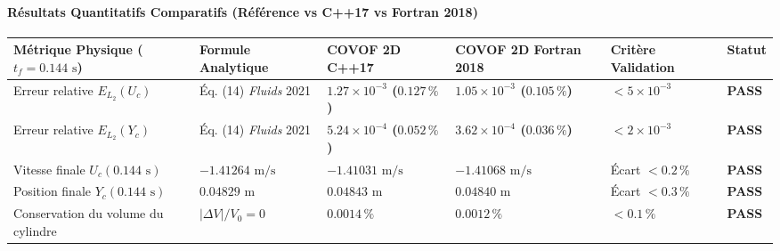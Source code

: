 \documentclass[
  10pt,
]{article}
\newcounter{none} %
\begin{document}
\paragraph{Résultats Quantitatifs Comparatifs (Référence vs C++17 vs
Fortran
2018)}\label{ruxe9sultats-quantitatifs-comparatifs-ruxe9fuxe9rence-vs-c17-vs-fortran-2018-14}

{\def\LTcaptype{none} %
\begin{longtable}[]{@{}
  >{\raggedright\arraybackslash}p{}
  >{\centering\arraybackslash}p{}
  >{\centering\arraybackslash}p{}
  >{\centering\arraybackslash}p{}
  >{\centering\arraybackslash}p{}
  >{\centering\arraybackslash}p{}@{}}
\toprule\noalign{}
\begin{minipage}[b]{\linewidth}\raggedright
Métrique Physique (\(t_f = 0.144\text{ s}\))
\end{minipage} & \begin{minipage}[b]{\linewidth}\centering
Formule Analytique
\end{minipage} & \begin{minipage}[b]{\linewidth}\centering
COVOF 2D C++17
\end{minipage} & \begin{minipage}[b]{\linewidth}\centering
COVOF 2D Fortran 2018
\end{minipage} & \begin{minipage}[b]{\linewidth}\centering
Critère Validation
\end{minipage} & \begin{minipage}[b]{\linewidth}\centering
Statut
\end{minipage} \\
\midrule\noalign{}
\endhead
\bottomrule\noalign{}
\endlastfoot
Erreur relative \(E_{L_2}(U_c)\) & Éq. (14) \emph{Fluids} 2021 &
\textbf{\(1.27 \times 10^{-3}\) (\(0.127\,\%\))} &
\textbf{\(1.05 \times 10^{-3}\) (\(0.105\,\%\))} &
\(< 5 \times 10^{-3}\) & \textbf{PASS} \\
Erreur relative \(E_{L_2}(Y_c)\) & Éq. (14) \emph{Fluids} 2021 &
\textbf{\(5.24 \times 10^{-4}\) (\(0.052\,\%\))} &
\textbf{\(3.62 \times 10^{-4}\) (\(0.036\,\%\))} &
\(< 2 \times 10^{-3}\) & \textbf{PASS} \\
Vitesse finale \(U_c(0.144\text{ s})\) & \(-1.41264\text{ m/s}\) &
\textbf{\(-1.41031\text{ m/s}\)} & \textbf{\(-1.41068\text{ m/s}\)} &
Écart \(< 0.2\,\%\) & \textbf{PASS} \\
Position finale \(Y_c(0.144\text{ s})\) & \(0.04829\text{ m}\) &
\textbf{\(0.04843\text{ m}\)} & \textbf{\(0.04840\text{ m}\)} & Écart
\(< 0.3\,\%\) & \textbf{PASS} \\
Conservation du volume du cylindre & \(|\Delta V|/V_0 = 0\) &
\textbf{\(0.0014\,\%\)} & \textbf{\(0.0012\,\%\)} & \(< 0.1\,\%\) &
\textbf{PASS} \\
\end{longtable}
}
\end{document}

